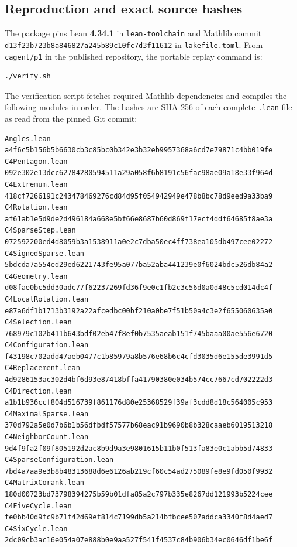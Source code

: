 \documentclass[11pt,a4paper]{article}
\begin{document}
\subsection{Reproduction and exact source hashes}\label{reproduction-and-exact-source-hashes}

The package pins Lean \textbf{4.34.1} in \href{https://github.com/mpelteshki/climbing-to-the-frontier/blob/29fbb70da18564048f62492e43870f2f96a65463/cagent/p1/lean-toolchain}{\texttt{lean-toolchain}} and Mathlib commit \texttt{d13f23b7\allowbreak{}23b8a846\allowbreak{}827a245b\allowbreak{}89c10fc7\allowbreak{}d3f11612} in \href{https://github.com/mpelteshki/climbing-to-the-frontier/blob/29fbb70da18564048f62492e43870f2f96a65463/cagent/p1/lakefile.toml}{\texttt{lakefile.toml}}. From \texttt{cagent/p1} in the published repository, the portable replay command is:

\begin{Verbatim}[breaklines,breakanywhere,fontsize=\footnotesize]
./verify.sh
\end{Verbatim}

The \href{https://github.com/mpelteshki/climbing-to-the-frontier/blob/29fbb70da18564048f62492e43870f2f96a65463/cagent/p1/verify.sh}{verification script} fetches required Mathlib dependencies and compiles the following modules in order. The hashes are SHA-256 of each complete \texttt{.lean} file as read from the pinned Git commit:

\begin{Verbatim}[breaklines,breakanywhere,fontsize=\footnotesize]
Angles.lean a4f6c5b156b5b6630cb3c85bc0b342e3b32eb9957368a6cd7e79871c4bb019fe
C4Pentagon.lean 092e302e13dcc62784280594511a29a058f6b8191c56fac98ae09a18e33f964d
C4Extremum.lean 418cf7266191c243478469276cd84d95f054942949e478b8bc78d9eed9a33ba9
C4Rotation.lean af61ab1e5d9de2d496184a668e5bf66e8687b60d869f17ecf4ddf64685f8ae3a
C4SparseStep.lean 072592200ed4d8059b3a1538911a0e2c7dba50ec4ff738ea105db497cee02272
C4SignedSparse.lean 5bdcda7a554ed29ed6221743fe95a077ba52aba441239e0f6024bdc526db84a2
C4Geometry.lean d08fae0bc5dd30adc77f62237269fd36f9e0c1fb2c3c56d0a0d48c5cd014dc4f
C4LocalRotation.lean e87a6df1b1713b3192a22afcedbc00bf210a0be7f51b50a4c3e2f655060635a0
C4Selection.lean 768979c102b411b643bdf02eb47f8ef0b7535aeab151f745baaa00ae556e6720
C4Configuration.lean f43198c702add47aeb0477c1b85979a8b576e68b6c4cfd3035d6e155de3991d5
C4Replacement.lean 4d9286153ac302d4bf6d93e87418bffa41790380e034b574cc7667cd702222d3
C4Direction.lean a1b1b936ccf804d516739f861176d80e25368529f39af3cdd8d18c564005c953
C4MaximalSparse.lean 370d792a5e0d7b6b1b56dfbdf57577b68eac91b9690b8b328caaeb6019513218
C4NeighborCount.lean 9d4f9fa2f09f805192d2ac8b9d9a3e9801615b11b0f513fa83e0c1abb5d74833
C4SparseConfiguration.lean 7bd4a7aa9e3b8b48313688d6e6126ab219cf60c54ad275089fe8e9fd050f9932
C4MatrixCorank.lean 180d00723bd73798394275b59b01dfa85a2c797b335e8267dd121993b5224cee
C4FiveCycle.lean fe0bb40d9fc9b71f42d69ef814c7199db5a214bfbcee507addca3340f8d4aed7
C4SixCycle.lean 2dc09cb3ac16e054a07e888b0e9aa527f541f4537c84b906b34ec0646df1be6f
\end{Verbatim}
\end{document}
